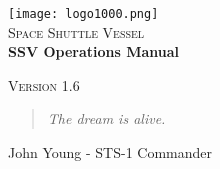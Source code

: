 \documentclass{article}
\begin{document}
\begin{titlepage}

\begin{center}

\texttt{[image: logo1000.png]}\\[1cm]

\textsc{\LARGE Space Shuttle Vessel}\\[1.5cm]

\huge \bfseries SSV Operations Manual\\[0.4cm]

\vfill

\textsc{\Large Version 1.6}\\[0.5cm]

\end{center}
\end{titlepage}


\newpage
\thispagestyle{empty}
\vspace*{\fill}
\begin{quote}
\centering
\textit{The dream is alive.}
\end{quote}
\begin{flushright}
John Young - STS-1 Commander
\end{flushright}
\vspace*{\fill}
\newpage





\newpage
\tableofcontents


\newpage

\newpage

\newpage

\newpage

\newpage

\newpage

\newpage

\newpage

\newpage

\newpage

\newpage

\newpage

\end{document}
